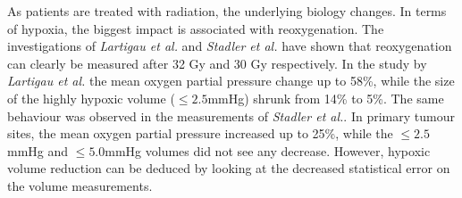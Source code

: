 As patients are treated with radiation, the underlying biology changes. In terms of hypoxia, the biggest impact is associated with reoxygenation. The investigations of \textit{Lartigau et al.}\cite{pmid9797698} and \textit{Stadler et al.}\cite{pmid9783887} have shown that reoxygenation can clearly be measured after 32 Gy and 30 Gy respectively. In the study by \textit{Lartigau et al.} the mean oxygen partial pressure change up to 58\%, while the size of the highly hypoxic volume ($\leq 2.5$mmHg) shrunk from 14\% to 5\%. The same behaviour was observed in the measurements of \textit{Stadler et al.}. In primary tumour sites, the mean oxygen partial pressure increased up to 25\%, while the $\leq 2.5$mmHg and $\leq 5.0$mmHg volumes did not see any decrease. However, hypoxic volume reduction can be deduced by looking at the decreased statistical error on the volume measurements. 
